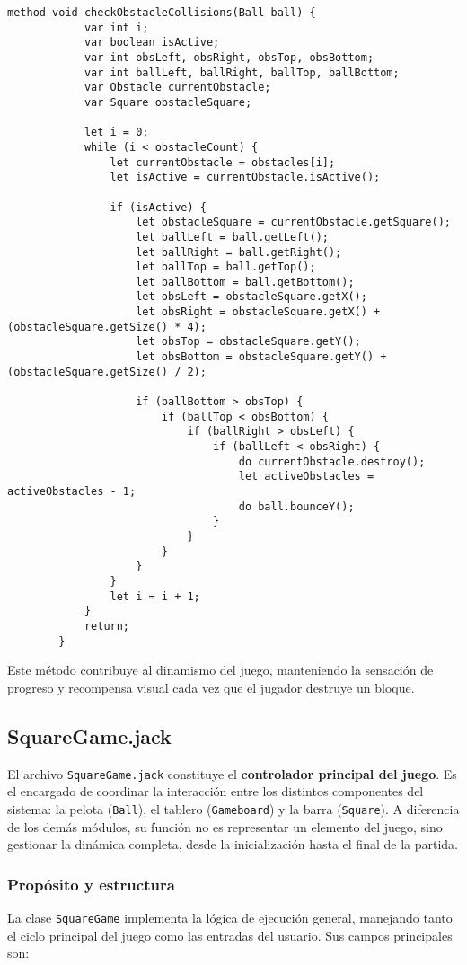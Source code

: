 \documentclass[twocolumn]{article}
\begin{document}
	\begin{lstlisting}[caption=Gestión de colisiones con los obstáculos]
		method void checkObstacleCollisions(Ball ball) {
			var int i;
			var boolean isActive; 
			var int obsLeft, obsRight, obsTop, obsBottom;
			var int ballLeft, ballRight, ballTop, ballBottom;
			var Obstacle currentObstacle;
			var Square obstacleSquare;
			
			let i = 0;
			while (i < obstacleCount) {
				let currentObstacle = obstacles[i];
				let isActive = currentObstacle.isActive(); 
				
				if (isActive) {
					let obstacleSquare = currentObstacle.getSquare();
					let ballLeft = ball.getLeft();
					let ballRight = ball.getRight();
					let ballTop = ball.getTop();
					let ballBottom = ball.getBottom();
					let obsLeft = obstacleSquare.getX();
					let obsRight = obstacleSquare.getX() + (obstacleSquare.getSize() * 4);
					let obsTop = obstacleSquare.getY();
					let obsBottom = obstacleSquare.getY() + (obstacleSquare.getSize() / 2);
					
					if (ballBottom > obsTop) {
						if (ballTop < obsBottom) {
							if (ballRight > obsLeft) {
								if (ballLeft < obsRight) {
									do currentObstacle.destroy();
									let activeObstacles = activeObstacles - 1; 
									do ball.bounceY();
								}
							}
						}
					}
				}
				let i = i + 1;
			}
			return;
		}
	\end{lstlisting}
	
	Este método contribuye al dinamismo del juego, manteniendo la sensación de progreso y recompensa visual cada vez que el jugador destruye un bloque.
	
	\subsection{SquareGame.jack}
	El archivo \texttt{SquareGame.jack} constituye el \textbf{controlador principal del juego}. Es el encargado de coordinar la interacción entre los distintos componentes del sistema: la pelota (\texttt{Ball}), el tablero (\texttt{Gameboard}) y la barra (\texttt{Square}). A diferencia de los demás módulos, su función no es representar un elemento del juego, sino gestionar la dinámica completa, desde la inicialización hasta el final de la partida.
	
	\subsubsection{Propósito y estructura}
	La clase \texttt{SquareGame} implementa la lógica de ejecución general, manejando tanto el ciclo principal del juego como las entradas del usuario.  
	Sus campos principales son:
	
\end{document}
